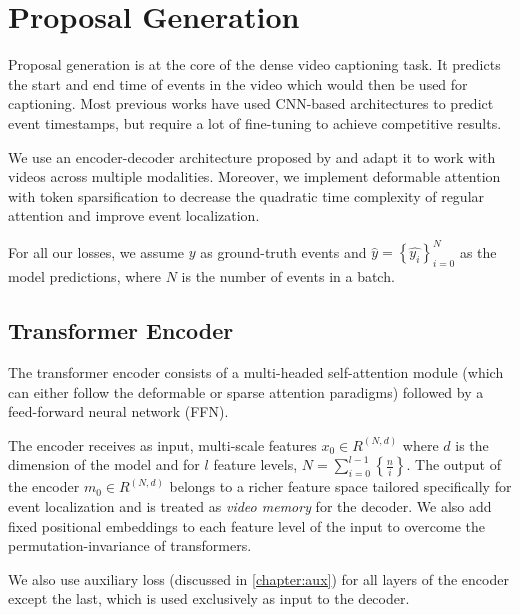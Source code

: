 \section{Proposal Generation}
\par Proposal generation is at the core of the dense video captioning task. It predicts the start and end time of events in the video which would then be used for captioning. Most previous works have used CNN-based architectures to predict event timestamps, but require a lot of fine-tuning to achieve competitive results.
\par We use an encoder-decoder architecture proposed by \cite{carion2020detr} and adapt it to work with videos across multiple modalities. Moreover, we implement deformable  attention \cite{zhu2020deformable} with token sparsification \cite{roh2021sparse} to decrease the quadratic time complexity of regular attention and improve event localization.
\par For all our losses, we assume $y$ as ground-truth events and $\hat{y}=\left \{ \hat{y_{i}} \right \}_{i=0}^{N}$ as the model predictions, where $N$ is the number of events in a batch.

\subsection{Transformer Encoder}
\par The transformer encoder consists of a multi-headed self-attention module (which can either follow the deformable or sparse attention paradigms) followed by a feed-forward neural network (FFN). 
\par The encoder receives as input, multi-scale features $x_{0} \in R^{(N , d)}$ where $d$ is the dimension of the model and for $l$ feature levels, $N = \sum_{i=0}^{l-1}\left \{\frac{n}{i} \right \}$. The output of the encoder $m_{0} \in R^{(N , d)}$ belongs to a richer feature space tailored specifically for event localization and is treated as \textit{video memory} for the decoder. We also add fixed positional embeddings to each feature level of the input to overcome the permutation-invariance of transformers. 
\par We also use auxiliary loss (discussed in \ref{chapter:aux}) for all layers of the encoder except the last, which is used exclusively as input to the decoder.

